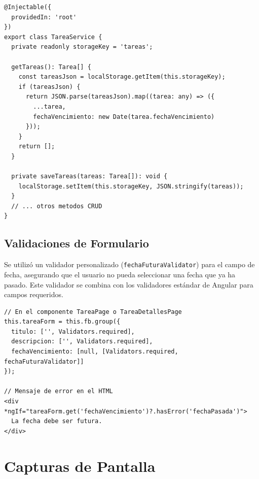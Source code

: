 \documentclass{article}
\begin{document}
\begin{lstlisting}[breaklines=true]
@Injectable({
  providedIn: 'root'
})
export class TareaService {
  private readonly storageKey = 'tareas';

  getTareas(): Tarea[] {
    const tareasJson = localStorage.getItem(this.storageKey);
    if (tareasJson) {
      return JSON.parse(tareasJson).map((tarea: any) => ({
        ...tarea,
        fechaVencimiento: new Date(tarea.fechaVencimiento)
      }));
    }
    return [];
  }

  private saveTareas(tareas: Tarea[]): void {
    localStorage.setItem(this.storageKey, JSON.stringify(tareas));
  }
  // ... otros metodos CRUD
}
\end{lstlisting}

\subsection{Validaciones de Formulario}
Se utiliz\'o un validador personalizado (\texttt{fechaFuturaValidator}) para el campo de fecha, asegurando que el usuario no pueda seleccionar una fecha que ya ha pasado. Este validador se combina con los validadores est\'andar de Angular para campos requeridos.

\begin{lstlisting}[breaklines=true]
// En el componente TareaPage o TareaDetallesPage
this.tareaForm = this.fb.group({
  titulo: ['', Validators.required],
  descripcion: ['', Validators.required],
  fechaVencimiento: [null, [Validators.required, fechaFuturaValidator]]
});

// Mensaje de error en el HTML
<div *ngIf="tareaForm.get('fechaVencimiento')?.hasError('fechaPasada')">
  La fecha debe ser futura.
</div>
\end{lstlisting}

\section{Capturas de Pantalla}
\end{document}
